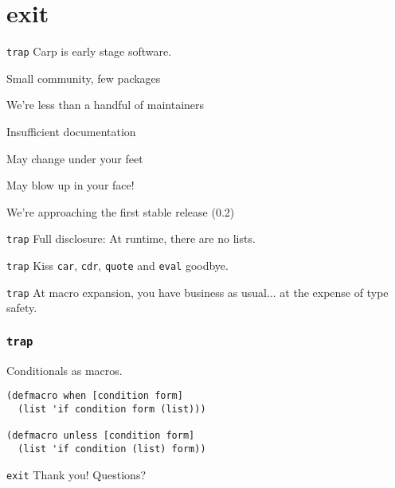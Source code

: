 \documentclass{beamer}
\begin{document}
  \section{exit}
  \begin{frame}{\texttt{trap}}
    Carp is early stage software.
    \begin{arrowlist}
      \item Small community, few packages
      \item We’re less than a handful of maintainers
      \item Insufficient documentation
      \item May change under your feet
      \item May blow up in your face!
    \end{arrowlist}
    We’re approaching the first stable release (0.2)
  \end{frame}
  \begin{frame}{\texttt{trap}}
    Full disclosure: At runtime, there are no lists.
  \end{frame}
  \begin{frame}{\texttt{trap}}
    Kiss \texttt{car}, \texttt{cdr}, \texttt{quote} and \texttt{eval} goodbye.
  \end{frame}
  \begin{frame}{\texttt{trap}}
    At macro expansion, you have business as usual... at the expense of type safety.
  \end{frame}
  \begin{frame}[fragile]
    \frametitle{\texttt{trap}}
    \begin{listing}[H]
      \caption{Conditionals as macros.}
      \begin{verbatim}
(defmacro when [condition form]
  (list 'if condition form (list)))

(defmacro unless [condition form]
  (list 'if condition (list) form))
      \end{verbatim}
    \end{listing}
  \end{frame}
  \begin{frame}{\texttt{exit}}
    \Huge Thank you!
    \linebreak
    \linebreak
    \linebreak
    \small Questions?
  \end{frame}
\end{document}
